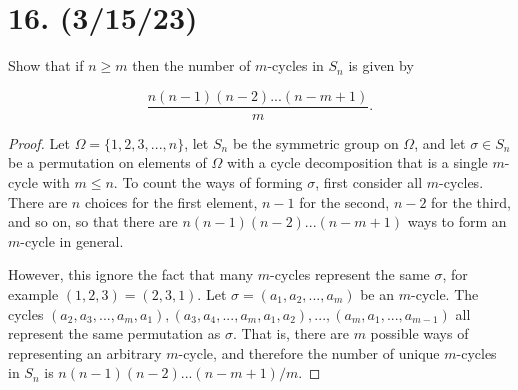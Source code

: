 \documentclass{article}
\begin{document}
\section*{16. (3/15/23)}

Show that if $n \geq m$ then the number of $m$-cycles in $S_n$ is given by

\begin{equation*}
    \frac{n(n - 1)(n - 2)...(n - m + 1)}{m}.
\end{equation*}
    
\begin{proof}
    Let $\Omega = \{1, 2, 3, ..., n\}$, let $S_n$ be the symmetric group on $\Omega$, and let $\sigma \in S_n$ be a permutation on elements of $\Omega$ with a cycle decomposition that is a single $m$-cycle with $m \leq n$. To count the ways of forming $\sigma$, first consider all $m$-cycles. There are $n$ choices for the first element, $n - 1$ for the second, $n - 2$ for the third, and so on, so that there are $n(n - 1)(n - 2)...(n - m + 1)$ ways to form an $m$-cycle in general.

    However, this ignore the fact that many $m$-cycles represent the same $\sigma$, for example $(1, 2, 3) = (2, 3, 1)$. Let $\sigma = (a_1, a_2, ..., a_m)$ be an $m$-cycle. The cycles $(a_2, a_3, ..., a_m, a_1), (a_3, a_4, ..., a_m, a_1, a_2), ..., (a_m, a_1, ..., a_{m - 1})$ all represent the same permutation as $\sigma$. That is, there are $m$ possible ways of representing an arbitrary $m$-cycle, and therefore the number of unique $m$-cycles in $S_n$ is $n(n - 1)(n - 2)...(n - m + 1)/m$.
\end{proof}
\end{document}
